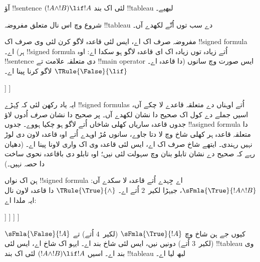 \documentclass[../../../include/open-logic-section]{subfiles}
\begin{document}
      {}
      {}


\begin{ex}
آؤ !!{sentence} $(!A \land !B) \lif !A$ لئی اک بند !!{tableau} لبھیے۔

شروع وچ اس نال متعلق مفروضہ !!{tableau} دے سب توں اُتّے لکھدے آں۔
\begin{oltableau}
  [\sFmla{\False}{(\formula{A} \land \formula{B}) \lif \formula{A}},
    just = \TAss]
\end{oltableau}

مفروضہ صرف اک اے، ایس لئی قاعدہ لاگو کرن لئی وی صرف اک
!!{signed formula} اے۔ (ہر !!{signed formula} اُتے زیادہ توں
زیادہ اک ای قاعدہ لاگو ہو سکدا اے: اوہ !!{sentence} دی متعلقہ
علامت تے !!{main operator} دا قاعدہ اے۔) ایس صورت وچ سانوں
$\TRule{\False}{\lif}$ لاگو کرنا پینا اے۔
\begin{oltableau}
  [\sFmla{\False}{(\formula{A} \land \formula{B}) \lif \formula{A}},
    checked, just = \TAss
    [\sFmla{\True}{\formula{A} \land \formula{B}},
      just={\TRule{\False}{\lif}[1]}
      [\sFmla{\False}{\formula{A}}, just={\TRule{\False}{\lif}[1]}]
    ]
  ]
\end{oltableau}
ایہ یاد رکھن لئی کہ کِہڑے !!{signed formula}s اُتے اوہناں دے
متعلقہ قاعدے لا چکے آں، اسیں جملے دے کول اک صحیح دا نشان لکھدے
آں۔ پر صحیح دا نشان \emph{صرف} اُدوں لاؤ جدوں قاعدہ ساریاں
کھلی شاخاں اُتے لاگو ہو چکیا ہووے۔ جدوں !!a{signed formula}
دا متعلقہ قاعدہ ہر کھلی شاخ وچ لا دتا جاوے، سانوں مُڑ اوہدے
اُتے اوہ قاعدہ لاون دی لوڑ نہیں رہندی۔ ایتھے شاخ صرف اک اے،
ایس لئی قاعدہ وی اک واری لاونا پینا اے۔ (دھیان رہے کہ صحیح دے
نشان تابلو بنان وچ سہولت لئی نیں؛ اوہ تابلو دی باقاعدہ نحوی
ساخت دا حصہ نہیں۔)

ہن اک نواں !!{signed formula} اے جِہدے اُتے قاعدہ لا سکدے آں:
$\sFmla{\True}{!A \land !B}$، جیہڑا لکیر~$2$ اُتے اے۔
$\TRule{\True}{\land}$ دا قاعدہ لاون نال ایہ ملدا اے:
\begin{oltableau}
  [\sFmla{\False}{(\formula{A} \land \formula{B}) \lif \formula{A}},
    checked, just = \TAss
    [\sFmla{\True}{\formula{A} \land \formula{B}},
      just={\TRule{\False}{\lif}[1]}, checked
      [\sFmla{\False}{\formula{A}}, just={\TRule{\False}{\lif}[1]}
        [\sFmla{\True}{\formula{A}}, just={\TRule{\True}{\land}[2]}
          [\sFmla{\True}{\formula{B}}, just={\TRule{\True}{\land}[2]}, close
          ]
        ]
      ]
    ]
  ]
\end{oltableau}
کیوں جے ہن شاخ وچ $\sFmla{\True}{!A}$ (لکیر~$4$ اُتے)
تے $\sFmla{\False}{!A}$ (لکیر~$3$ اُتے) دونیں نیں، ایس لئی
شاخ بند اے۔ ایہو اک شاخ اے، ایس لئی !!{tableau} وی بند اے۔
اسیں $(!A \land !B) \lif !A$ لئی اک بند !!{tableau} لبھ لیا اے۔
\end{ex}
\end{document}
